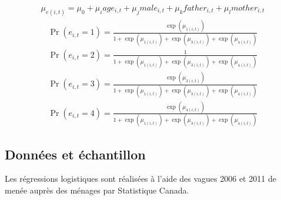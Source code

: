 \documentclass[letterpaper,10pt,french]{sphinxmanual}
\begin{document}
\begin{equation*}
\begin{split}\mu_{e(i,t)} = \mu_{0} + \mu_{i} age_{i,t} + \mu_{j} male_{i,t} + \mu_{k} father_{i,t} + \mu_{l} mother_{i,t}\end{split}
\end{equation*}\begin{equation*}
\begin{split}\Pr(e_{i,t}=1) = \frac{\exp(\mu_{1(i,t)})}{1+\exp(\mu_{1(i,t)})+\exp(\mu_{3(i,t)})+\exp(\mu_{4(i,t)})}\end{split}
\end{equation*}\begin{equation*}
\begin{split}\Pr(e_{i,t}=2) = \frac{1}{1+\exp(\mu_{1(i,t)})+\exp(\mu_{3(i,t)})+\exp(\mu_{4(i,t)})}\end{split}
\end{equation*}\begin{equation*}
\begin{split}\Pr(e_{i,t}=3) = \frac{\exp(\mu_{3(i,t)})}{1+\exp(\mu_{1(i,t)})+\exp(\mu_{3(i,t)})+\exp(\mu_{4(i,t)})}\end{split}
\end{equation*}\begin{equation*}
\begin{split}\Pr(e_{i,t}=4) = \frac{\exp(\mu_{4(i,t)})}{1+\exp(\mu_{1(i,t)})+\exp(\mu_{3(i,t)})+\exp(\mu_{4(i,t)})}\end{split}
\end{equation*}

\subsection{Données et échantillon}
\label{\detokenize{transition_models:id2}}
Les régressions logistiques sont réalisées à l’aide des vagues 2006 et 2011 de  menée auprès des ménages par Statistique Canada.
\end{document}
